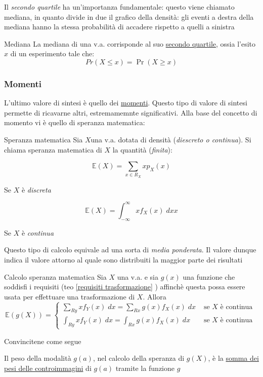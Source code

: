 Il \textit{secondo quartile} ha un'importanza fundamentale: questo viene chiamato mediana, in quanto divide in due il grafico della densità: gli eventi a destra della mediana hanno la stessa probabilità di accadere rispetto a quelli a sinistra
\begin{definizione}{Mediana}
	La mediana di una v.a. corrisponde al suo \underline{secondo quartile}, ossia l'esito $ x $ di un esperimento tale che:
	\[
		Pr\left(X \le x\right) =\Pr\left(X \ge  x\right)
	\]
\end{definizione}
\subsubsection*{Momenti}
L'ultimo valore di sintesi è quello dei \underline{momenti}. Questo tipo di valore di sintesi permette di ricavarne altri, estremamemnte significativi. Alla base del concetto di momento vi è quello di speranza matematica:
\begin{definizione}{Speranza matematica}
	Sia $  X  $una v.a. dotata di densità (\textit{diescreto o continua}). Si chiama speranza matematica di $ X $ la quantità (\textit{finita}):

	\begin{minipage}[t]{0.48\textwidth}
		\[
			\mathbb{E}\left(X\right) = \sum_{x \in  R_{X}} x p_X\left(x\right)
		\]
		\begin{center}
			Se $ X $ è \textit{discreta}
		\end{center}
	\end{minipage}
	\begin{minipage}[t]{0.48\textwidth}
		\[
			\mathbb{E}\left(X\right) = \int_{-\infty }^{\infty } x f_X(x) \; dx x
		\]
		\begin{center}
			Se $ X $ è \textit{continua}
		\end{center}
	\end{minipage}
\end{definizione}
Questo tipo di calcolo equivale ad una sorta di \textit{media ponderata}. Il valore dunque indica il valore attorno al quale sono distribuiti la maggior parte dei risultati
\begin{teorema}{Calcolo speranza matematica}
	Sia $ X $ una v.a. e sia $ g\left(x\right) $ una funzione che soddisfi i requisiti (teo \ref{requisiti trasformazione} ) affinchè questa possa essere usata per effettuare una trasformazione di $ X $. Allora
	\[
		\mathbb{E} \left(g\left(X\right)\right) =
		\begin{cases}
			\sum_{Ry} xf_{Y}\left(x\right) \; dx = \sum_{Rx} g\left(x\right)f_{X}\left(x\right) \; dx & \text{ se } X \text{ è continua } \\[8pt]
			\int_{Ry} xf_{Y}\left(x\right) \; dx = \int_{Rx} g\left(x\right)f_{X}\left(x\right) \; dx & \text{ se } X \text{ è continua }
		\end{cases}
	\]
\end{teorema}
Convincitene come segue
\begin{tcolorbox}
	Il peso della modalità $ g\left(a\right) $, nel calcolo della speranza di $ g\left(X\right) $, è la \underline{somma dei pesi delle controimmagini} di $ g\left(a\right) $ tramite la funzione $ g $
\end{tcolorbox}

